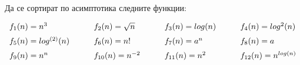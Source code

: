 \begin{problem}
	Да се сортират по асимптотика следните функции:
	\vspace{0.25cm}
	\noindent
	\begin{center}
		$\begin{array}{llll}
			f_1(n)=n^3\qquad          & f_2(n)=\sqrt n\qquad    & f_3(n)=log(n)\qquad    & f_4(n)=log^2(n)      \vspace{0.2cm}\\
			f_5(n)=log^{(2)}(n)\qquad & f_6(n)=n!\qquad         & f_7(n)=a^n\qquad       & f_8(n)=a             \vspace{0.2cm}\\
			f_9(n)=n^n\qquad          & f_{10}(n)=n^{-2}\qquad  & f_{11}(n)=n^2\qquad    & f_{12}(n)=n^{log(n)}
		\end{array}$
	\end{center}
\end{problem}
\vspace{0.25cm}

